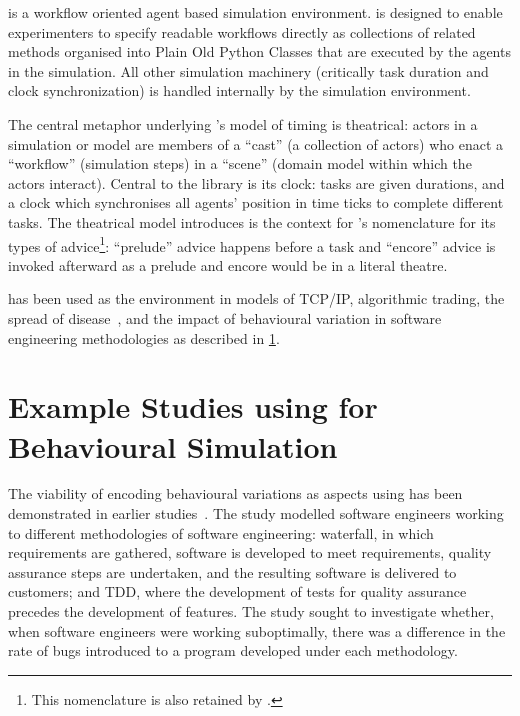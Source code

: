 
\begin{blockquote}
    \theatreag{} is a workflow oriented agent based simulation environment.
\theatreag{} is designed to enable experimenters to specify readable workflows
directly as collections of related methods organised into Plain Old Python
Classes that are executed by the agents in the simulation. All other simulation
machinery (critically task duration and clock synchronization) is handled
internally by the simulation environment.
\end{blockquote}

The central metaphor underlying \theatreag{}'s model of timing is theatrical:
actors in a simulation or model are members of a ``cast'' (a collection of
actors) who enact a ``workflow'' (simulation steps) in a ``scene'' (domain model
within which the actors interact). Central to the library is its clock: tasks
are given durations, and a clock which synchronises all agents' position in time
ticks to complete different tasks. The theatrical model \theatreag{} introduces
is the context for \pydysofu{}'s nomenclature for its types of
advice\footnote{This nomenclature is also retained by \pdsfthree{}.}:
``prelude'' advice happens before a task and ``encore'' advice is invoked
afterward as a prelude and encore would be in a literal theatre.

\theatreag{} has been used as the environment in models of TCP/IP, algorithmic
trading, the spread of disease~\cite{aranTheatreThesis}, and the impact of
behavioural variation in software engineering methodologies as described in
\cref{sec:caise_paper}.


\section{Example Studies using \pydysofu for Behavioural Simulation}\label{sec:caise_paper}

The viability of encoding behavioural variations as aspects using \pydysofu has been
demonstrated in earlier studies~\cite{wallis2018caise,aranTheatreThesis}.
 The study modelled software engineers working to
different methodologies of software engineering: waterfall, in which
requirements are gathered, software is developed to meet requirements, quality
assurance steps are undertaken, and the resulting software is delivered to
customers; and TDD, where the development of tests for quality assurance
precedes the development of features. The study sought to investigate whether,
when software engineers were working suboptimally, there was a difference in the
rate of bugs introduced to a program developed under each methodology.

